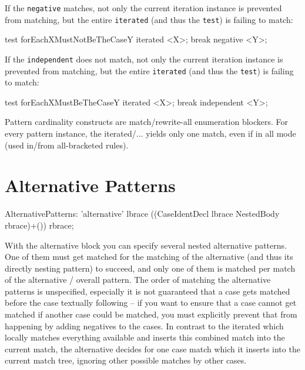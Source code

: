 \begin{example}
If the \texttt{negative} matches, not only the current iteration instance is prevented from matching, but the entire \texttt{iterated} (and thus the \texttt{test}) is failing to match:
  \begin{grgen}
test forEachXMustNotBeTheCaseY
{
  iterated {
    <X>;
    break negative { 
      <Y>;
    }
  }
}
  \end{grgen}

If the \texttt{independent} does not match, not only the current iteration instance is prevented from matching, but the entire \texttt{iterated} (and thus the \texttt{test}) is failing to match:
  \begin{grgen}
test forEachXMustBeTheCaseY
{
  iterated {
    <X>;
    break independent { 
      <Y>;
    }
  }
}
  \end{grgen}
\end{example}

\begin{warning}
Pattern cardinality constructs are match/rewrite-all enumeration blockers.
For every pattern instance, the iterated/... yields only one match, even if in all mode (used in/from all-bracketed rules).
\end{warning} 


\section{Alternative Patterns}
\label{alternative}

\begin{rail}  
  AlternativePatterns: 
    'alternative' lbrace ((CaseIdentDecl lbrace NestedBody rbrace)+()) rbrace;
\end{rail}

With the alternative block you can specify several nested alternative patterns. One of them must get matched for the matching of the alternative (and thus its directly nesting pattern) to succeed, and only one of them is matched per match of the alternative / overall pattern.
The order of matching the alternative patterns is unspecified, especially it is not guaranteed that a case gets matched before the case textually following -- if you want to ensure that a case cannot get matched if another case could be matched, you must explicitly prevent that from happening by adding negatives to the cases.
In contrast to the iterated which locally matches everything available and inserts this combined match into the current match, the alternative decides for one case match which it inserts into the current match tree, ignoring other possible matches by other cases. 

